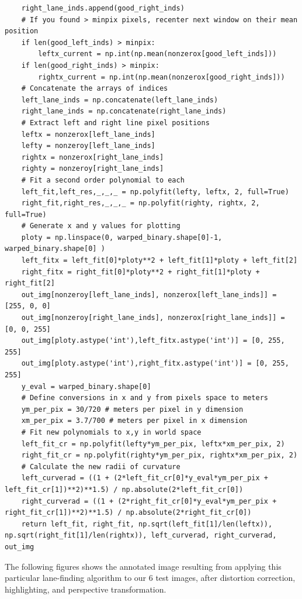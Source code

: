 \documentclass[11pt]{article}
\begin{document}
\begin{verbatim}
	right_lane_inds.append(good_right_inds)
	# If you found > minpix pixels, recenter next window on their mean position
	if len(good_left_inds) > minpix:
	    leftx_current = np.int(np.mean(nonzerox[good_left_inds]))
	if len(good_right_inds) > minpix:        
	    rightx_current = np.int(np.mean(nonzerox[good_right_inds]))
    # Concatenate the arrays of indices
    left_lane_inds = np.concatenate(left_lane_inds)
    right_lane_inds = np.concatenate(right_lane_inds)
    # Extract left and right line pixel positions
    leftx = nonzerox[left_lane_inds]
    lefty = nonzeroy[left_lane_inds] 
    rightx = nonzerox[right_lane_inds]
    righty = nonzeroy[right_lane_inds] 
    # Fit a second order polynomial to each
    left_fit,left_res,_,_,_ = np.polyfit(lefty, leftx, 2, full=True)
    right_fit,right_res,_,_,_ = np.polyfit(righty, rightx, 2, full=True)
    # Generate x and y values for plotting
    ploty = np.linspace(0, warped_binary.shape[0]-1, warped_binary.shape[0] )
    left_fitx = left_fit[0]*ploty**2 + left_fit[1]*ploty + left_fit[2]
    right_fitx = right_fit[0]*ploty**2 + right_fit[1]*ploty + right_fit[2]
    out_img[nonzeroy[left_lane_inds], nonzerox[left_lane_inds]] = [255, 0, 0]
    out_img[nonzeroy[right_lane_inds], nonzerox[right_lane_inds]] = [0, 0, 255]
    out_img[ploty.astype('int'),left_fitx.astype('int')] = [0, 255, 255]
    out_img[ploty.astype('int'),right_fitx.astype('int')] = [0, 255, 255]
    y_eval = warped_binary.shape[0]
    # Define conversions in x and y from pixels space to meters
    ym_per_pix = 30/720 # meters per pixel in y dimension
    xm_per_pix = 3.7/700 # meters per pixel in x dimension
    # Fit new polynomials to x,y in world space
    left_fit_cr = np.polyfit(lefty*ym_per_pix, leftx*xm_per_pix, 2)
    right_fit_cr = np.polyfit(righty*ym_per_pix, rightx*xm_per_pix, 2)
    # Calculate the new radii of curvature
    left_curverad = ((1 + (2*left_fit_cr[0]*y_eval*ym_per_pix + left_fit_cr[1])**2)**1.5) / np.absolute(2*left_fit_cr[0])
    right_curverad = ((1 + (2*right_fit_cr[0]*y_eval*ym_per_pix + right_fit_cr[1])**2)**1.5) / np.absolute(2*right_fit_cr[0])
    return left_fit, right_fit, np.sqrt(left_fit[1]/len(leftx)), np.sqrt(right_fit[1]/len(rightx)), left_curverad, right_curverad, out_img
\end{verbatim}

The following figures shows the annotated image resulting from
applying this particular lane-finding algorithm to our 6 test
images, after distortion correction, highlighting, and
perspective transformation.
\end{document}
